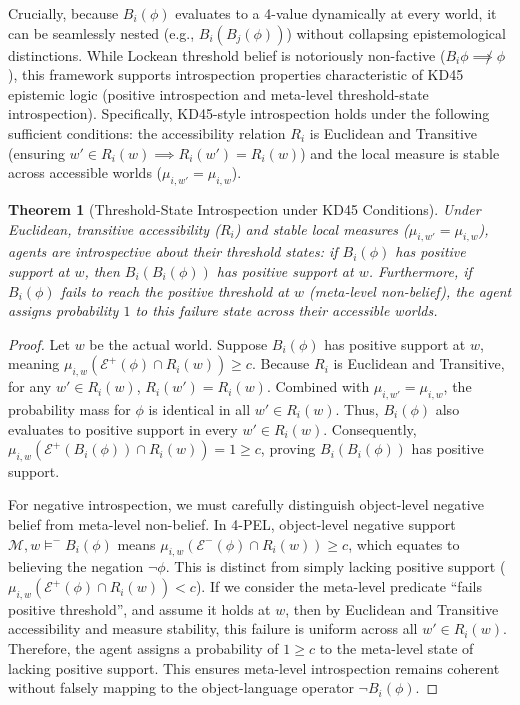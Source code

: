 \documentclass[11pt,a4paper]{article}
\newtheorem{theorem}{Theorem}[section]
\begin{document}
Crucially, because $B_i(\phi)$ evaluates to a 4-value dynamically at every world, it can be seamlessly nested (e.g., $B_i(B_j(\phi))$) without collapsing epistemological distinctions. While Lockean threshold belief is notoriously non-factive ($B_i\phi \not\implies \phi$), this framework supports introspection properties characteristic of KD45 epistemic logic (positive introspection and meta-level threshold-state introspection). Specifically, KD45-style introspection holds under the following sufficient conditions: the accessibility relation $R_i$ is Euclidean and Transitive (ensuring $w' \in R_i(w) \implies R_i(w') = R_i(w)$) and the local measure is stable across accessible worlds ($\mu_{i,w'} = \mu_{i,w}$).

\begin{theorem}[Threshold-State Introspection under KD45 Conditions]
Under Euclidean, transitive accessibility ($R_i$) and stable local measures ($\mu_{i,w'} = \mu_{i,w}$), agents are introspective about their threshold states: if $B_i(\phi)$ has positive support at $w$, then $B_i(B_i(\phi))$ has positive support at $w$. Furthermore, if $B_i(\phi)$ fails to reach the positive threshold at $w$ (meta-level non-belief), the agent assigns probability $1$ to this failure state across their accessible worlds.
\end{theorem}
\begin{proof}
Let $w$ be the actual world. Suppose $B_i(\phi)$ has positive support at $w$, meaning $\mu_{i,w}(\mathcal{E}^+(\phi) \cap R_i(w)) \ge c$. Because $R_i$ is Euclidean and Transitive, for any $w' \in R_i(w)$, $R_i(w') = R_i(w)$. Combined with $\mu_{i,w'} = \mu_{i,w}$, the probability mass for $\phi$ is identical in all $w' \in R_i(w)$. Thus, $B_i(\phi)$ also evaluates to positive support in every $w' \in R_i(w)$. Consequently, $\mu_{i,w}(\mathcal{E}^+(B_i(\phi)) \cap R_i(w)) = 1 \ge c$, proving $B_i(B_i(\phi))$ has positive support. 

For negative introspection, we must carefully distinguish object-level negative belief from meta-level non-belief. In 4-PEL, object-level negative support $\mathcal{M}, w \models^- B_i(\phi)$ means $\mu_{i,w}(\mathcal{E}^-(\phi) \cap R_i(w)) \ge c$, which equates to believing the negation $\neg \phi$. This is distinct from simply lacking positive support ($\mu_{i,w}(\mathcal{E}^+(\phi) \cap R_i(w)) < c$). If we consider the meta-level predicate ``fails positive threshold'', and assume it holds at $w$, then by Euclidean and Transitive accessibility and measure stability, this failure is uniform across all $w' \in R_i(w)$. Therefore, the agent assigns a probability of $1 \ge c$ to the meta-level state of lacking positive support. This ensures meta-level introspection remains coherent without falsely mapping to the object-language operator $\neg B_i(\phi)$.
\end{proof}
\end{document}
